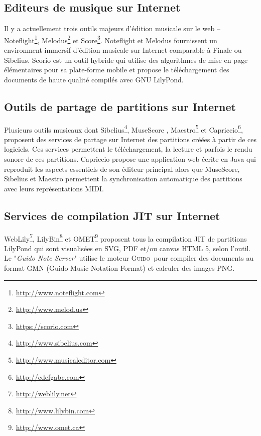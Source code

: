 \documentclass{article}
\newcommand{\guido}		{\textsc{Guido}}
\begin{document}
\subsection{Editeurs de musique sur Internet}\label{subsection:editor}
Il y a actuellement trois outils majeurs d'édition musicale sur le web -- Noteflight\footnote{\url{http://www.noteflight.com}}, Melodus\footnote{\url{http://www.melod.us}} et Score\footnote{\url{https://scorio.com}}. Noteflight et Melodus fournissent un environment immersif d'édition musicale sur Internet comparable à Finale ou Sibelius. Scorio est un outil hybride qui utilise des algorithmes de mise en page élémentaires pour sa plate-forme mobile et propose le téléchargement des documents de haute qualité compilés avec GNU LilyPond.

\subsection{Outils de partage de partitions sur Internet}\label{subsection:sharing}
Plusieurs outils musicaux dont Sibelius\footnote{\url{http://www.sibelius.com}}, Muse\-Score \cite{musescore}, Maestro\footnote{\url{http://www.musicaleditor.com}} et Capriccio\footnote{\url{http://cdefgabc.com}}, proposent des services de partage sur Internet des partitions créées à partir de ces logiciels. Ces services permettent le téléchargement, la lecture et parfois le rendu sonore de ces partitions. Capriccio propose une application web écrite en Java qui reproduit les aspects essentiels de son éditeur principal alors que MuseScore, Sibelius et Maestro permettent la synchronisation automatique des partitions avec leurs représentations MIDI.

\subsection{Services de compilation JIT sur Internet}\label{subsection:jit}
WebLily\footnote{\url{http://weblily.net}}, LilyBin\footnote{\url{http://www.lilybin.com}} et OMET\footnote{\url{http://www.omet.ca}} proposent tous la compilation JIT de partitions LilyPond qui sont visualisées en SVG, PDF et/ou canvas HTML 5, selon l'outil. Le "\emph{Guido Note Server}" \cite{renz98} utilise le moteur \guido\ pour compiler des documents au format GMN (Guido Music Notation Format) \cite{hoos98} et calculer des images PNG.
\end{document}
